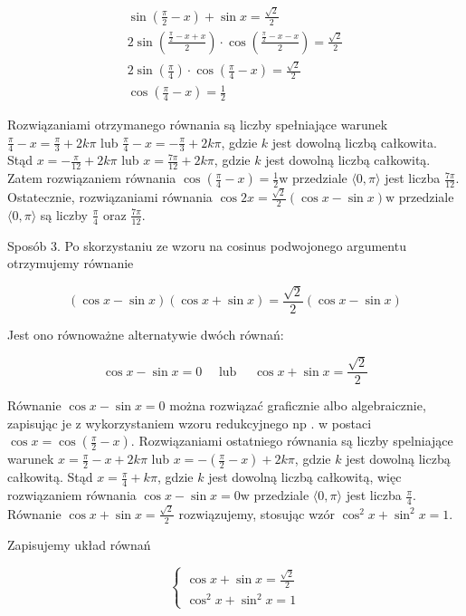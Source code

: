 \documentclass[10pt]{article}
\begin{document}
$$
\begin{gathered}
\sin \left(\frac{\pi}{2}-x\right)+\sin x=\frac{\sqrt{2}}{2} \\
2 \sin \left(\frac{\frac{\pi}{2}-x+x}{2}\right) \cdot \cos \left(\frac{\frac{\pi}{2}-x-x}{2}\right)=\frac{\sqrt{2}}{2} \\
2 \sin \left(\frac{\pi}{4}\right) \cdot \cos \left(\frac{\pi}{4}-x\right)=\frac{\sqrt{2}}{2} \\
\cos \left(\frac{\pi}{4}-x\right)=\frac{1}{2}
\end{gathered}
$$

Rozwiązaniami otrzymanego równania są liczby spełniające warunek $\frac{\pi}{4}-x=\frac{\pi}{3}+2 k \pi$ lub $\frac{\pi}{4}-x=-\frac{\pi}{3}+2 k \pi$, gdzie $k$ jest dowolną liczbą całkowita. Stąd $x=-\frac{\pi}{12}+2 k \pi$ lub $x=\frac{7 \pi}{12}+2 k \pi$, gdzie $k$ jest dowolną liczbą całkowitą.\\
Zatem rozwiązaniem równania $\cos \left(\frac{\pi}{4}-x\right)=\frac{1}{2} \mathrm{w}$ przedziale $\langle 0, \pi\rangle$ jest liczba $\frac{7 \pi}{12}$.\\
Ostatecznie, rozwiązaniami równania $\cos 2 x=\frac{\sqrt{2}}{2}(\cos x-\sin x) \mathrm{w}$ przedziale $\langle 0, \pi\rangle$ są liczby $\frac{\pi}{4}$ oraz $\frac{7 \pi}{12}$.

Sposób 3. Po skorzystaniu ze wzoru na cosinus podwojonego argumentu otrzymujemy równanie

$$
(\cos x-\sin x)(\cos x+\sin x)=\frac{\sqrt{2}}{2}(\cos x-\sin x)
$$

Jest ono równoważne alternatywie dwóch równań:

$$
\cos x-\sin x=0 \quad \text { lub } \quad \cos x+\sin x=\frac{\sqrt{2}}{2}
$$

Równanie $\cos x-\sin x=0$ można rozwiązać graficznie albo algebraicznie, zapisując je z wykorzystaniem wzoru redukcyjnego np . w postaci $\cos x=\cos \left(\frac{\pi}{2}-x\right)$. Rozwiązaniami ostatniego równania są liczby spelniające warunek $x=\frac{\pi}{2}-x+2 k \pi$ lub $x=-\left(\frac{\pi}{2}-x\right)+2 k \pi$, gdzie $k$ jest dowolną liczbą całkowitą. Stąd $x=\frac{\pi}{4}+k \pi$, gdzie $k$ jest dowolną liczbą całkowitą, więc rozwiązaniem równania $\cos x-\sin x=0 \mathrm{w}$ przedziale $\langle 0, \pi\rangle$ jest liczba $\frac{\pi}{4}$. Równanie $\cos x+\sin x=\frac{\sqrt{2}}{2}$ rozwiązujemy, stosując wzór $\cos ^{2} x+\sin ^{2} x=1$.

Zapisujemy układ równań

$$
\left\{\begin{array}{l}
\cos x+\sin x=\frac{\sqrt{2}}{2} \\
\cos ^{2} x+\sin ^{2} x=1
\end{array}\right.
$$
\end{document}
